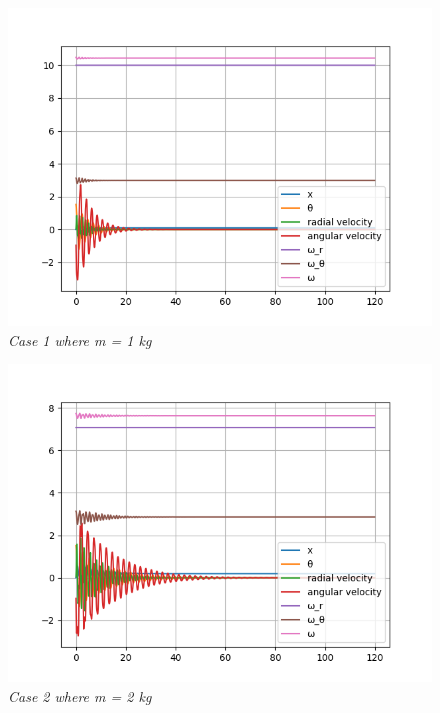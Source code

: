 \begin{figure}[H]
    \centering
    \includegraphics[width=15cm]{ExpPictures/m1.png}
    \caption{\textit{Case 1 where m = 1 kg}}
    \label{}
\end{figure}
        
\begin{figure}[H]
    \centering
    \includegraphics[width=15cm]{ExpPictures/m2.png}
    \caption{\textit{Case 2 where m = 2 kg}}
    \label{}
\end{figure}
        
